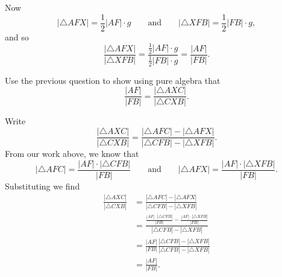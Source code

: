 \documentclass{ximera}
\begin{document}
\begin{question}
\begin{solution}
\begin{freeResponse}
\begin{image}
\end{image}
Now 
\[
|\triangle AFX| = \frac{1}{2} |AF|\cdot g\qquad\text{and}\qquad |\triangle XFB| = \frac{1}{2} |FB|\cdot g,
\]
and so
\[
\frac{|\triangle AFX|}{|\triangle XFB|} = \frac{\frac{1}{2} |AF|\cdot g}{\frac{1}{2} |FB|\cdot g} = \frac{|AF|}{|FB|}.
\]
\end{freeResponse}
\end{solution}
\end{question}

\begin{question}
\label{26} Use the previous question to show using pure algebra that%
\[
\frac{|AF|}{|FB|}=\frac{|\triangle AXC|}{|\triangle CXB|}. %
\]
\begin{solution}
\begin{freeResponse}
Write
\[
\frac{|\triangle AXC|}{|\triangle CXB|} = \frac{|\triangle AFC|-|\triangle AFX|}{|\triangle CFB|-|\triangle XFB|}.
\]
From our work above, we know that
\[
|\triangle AFC| = \frac{|AF|\cdot |\triangle CFB|}{|FB|} \qquad\text{and}\qquad |\triangle AFX| = \frac{|AF|\cdot |\triangle XFB|}{|FB|}.
\]
Substituting we find
\begin{align*}
\frac{|\triangle AXC|}{|\triangle CXB|} &= \frac{|\triangle AFC|-|\triangle AFX|}{|\triangle CFB|-|\triangle XFB|}\\
&=\frac{ \frac{|AF|\cdot |\triangle CFB|}{|FB|}- \frac{|AF|\cdot |\triangle XFB|}{|FB|}}{|\triangle CFB|-|\triangle XFB|}\\
&=\frac{|AF|}{|FB|} \frac{|\triangle CFB|- |\triangle XFB|}{|\triangle CFB|-|\triangle XFB|}\\
&=\frac{|AF|}{|FB|}.
\end{align*}
\end{freeResponse}
\end{solution}
\end{question}
\end{document}

